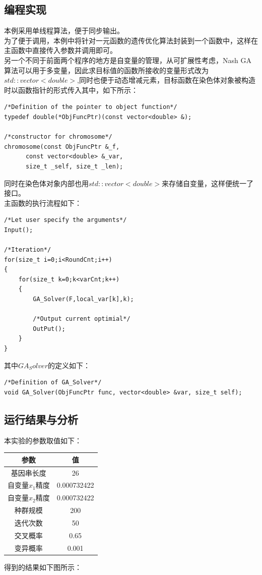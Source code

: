 \documentclass[UTF8]{ctexart}
\begin{document}
\subsection{编程实现}
本例采用单线程算法，便于同步输出。\\
为了便于调用，本例中将针对一元函数的遗传优化算法封装到一个函数中，这样在主函数中直接传入参数并调用即可。\\
另一个不同于前面两个程序的地方是自变量的管理，从可扩展性考虑，Nash GA算法可以用于多变量，因此求目标值的函数所接收的变量形式改为$std::vector<double>$,同时也便于动态增减元素，目标函数在染色体对象被构造时以函数指针的形式传入其中，如下所示：
\begin{lstlisting}
/*Definition of the pointer to object function*/
typedef double(*ObjFuncPtr)(const vector<double> &);

/*constructor for chromosome*/
chromosome(const ObjFuncPtr &_f, 
	  const vector<double> &_var, 
	  size_t _self, size_t _len);
\end{lstlisting}
同时在染色体对象内部也用$std::vector<double>$来存储自变量，这样便统一了接口。\\
\indent 主函数的执行流程如下：
\begin{lstlisting}
/*Let user specify the arguments*/
Input();

/*Iteration*/
for(size_t i=0;i<RoundCnt;i++)
{
	for(size_t k=0;k<varCnt;k++)
	{
		GA_Solver(F,local_var[k],k);

		/*Output current optimial*/
		OutPut();
	}
}
\end{lstlisting}
\indent 其中$GA_Solver$的定义如下：
\begin{lstlisting}
/*Definition of GA_Solver*/
void GA_Solver(ObjFuncPtr func, vector<double> &var, size_t self);
\end{lstlisting}

\subsection{运行结果与分析}
\indent 本实验的参数取值如下：
\begin{center}
\begin{tabular}{cc}
  \toprule
  参数 & 值 \\
  \midrule
  基因串长度 & 26 \\
  自变量$x_1$精度 & 0.000732422\\
  自变量$x_2$精度 & 0.000732422\\
  种群规模   & 200 \\
  迭代次数   & 50 \\
  交叉概率   & 0.65 \\
  变异概率   & 0.001 \\
  \bottomrule
\end{tabular}
\end{center}
得到的结果如下图所示：
\begin{center}
\end{center}
\end{document}
